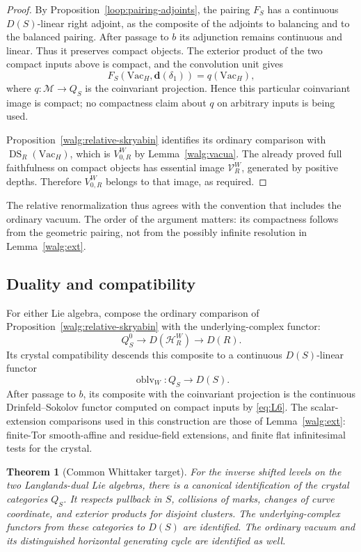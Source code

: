 \documentclass[11pt]{article}
\numberwithin{equation}{section}
\newtheorem{theorem}{Theorem}[section]
\theoremstyle{definition}
\theoremstyle{remark}
\begin{document}
\begin{proof}
By Proposition~\ref{loop:pairing-adjoints}, the pairing \(F_S\) has a
continuous \(D(S)\)-linear right adjoint, as the composite of the
adjoints to balancing and to the balanced pairing.  After passage to
\(b\) its adjunction remains continuous and linear.  Thus it
preserves compact objects.  The exterior product of the two compact
inputs above is compact, and the convolution unit gives
\[
 F_S(\mathrm{Vac}_H,\mathbf d(\delta_1))
      =q(\mathrm{Vac}_H),
\]
where \(q:\mathcal M\to Q_S\) is the coinvariant projection.
Hence this particular coinvariant image is compact; no compactness
claim about \(q\) on arbitrary inputs is being used.

Proposition~\ref{walg:relative-skryabin} identifies its ordinary
comparison with \(\operatorname{DS}_R(\mathrm{Vac}_H)\), which is
\(V_{0,R}^W\) by Lemma~\ref{walg:vacua}.  The already proved
full faithfulness on compact objects has essential image
\(\mathcal V_R^W\), generated by positive depths.  Therefore
\(V_{0,R}^W\) belongs to that image, as required.
\end{proof}

The relative renormalization thus agrees with the convention that
includes the ordinary vacuum.  The order of the argument matters:
its compactness follows from the geometric pairing, not from the
possibly infinite resolution in Lemma~\ref{walg:ext}.

\subsection{Duality and compatibility}

For either Lie algebra, compose the ordinary comparison of
Proposition~\ref{walg:relative-skryabin} with the underlying-complex
functor:
\[
 Q_S^0\longrightarrow D(\mathcal H_R^W)\longrightarrow D(R).
\]
Its crystal compatibility descends this composite to a continuous
\(D(S)\)-linear functor
\begin{equation}\label{eq:walg-forgetful}
 \operatorname{oblv}_W:Q_S\longrightarrow D(S).
\end{equation}
After passage to \(b\), its composite with the coinvariant projection
is the continuous Drinfeld--Sokolov functor computed on compact
inputs by \eqref{eq:L6}.  The scalar-extension comparisons used in
this construction are those of Lemma~\ref{walg:ext}: finite-Tor
smooth-affine and residue-field extensions, and finite flat
infinitesimal tests for the crystal.

\begin{theorem}[Common Whittaker target]\label{walg:common-target}
For the inverse shifted levels on the two Langlands-dual Lie
algebras, there is a canonical identification of the crystal
categories \(Q_S\).  It respects pullback in \(S\), collisions of
marks, changes of curve coordinate, and exterior products for
disjoint clusters.  The underlying-complex functors from these
categories to \(D(S)\) are identified.  The ordinary vacuum and its
distinguished horizontal generating cycle are identified as well.
\end{theorem}
\end{document}
